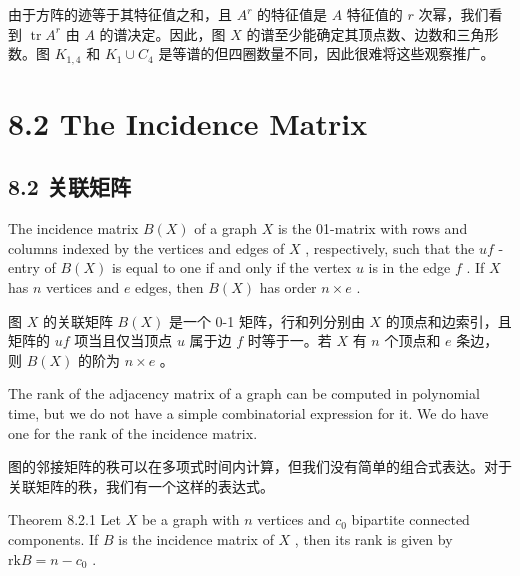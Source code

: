 \documentclass[10pt]{article}
\begin{document}
\begin{tcolorbox}\relax
由于方阵的迹等于其特征值之和，且 \({A}^{r}\) 的特征值是 \(A\) 特征值的 \(r\) 次幂，我们看到 \(\operatorname{tr}{A}^{r}\) 由 \(A\) 的谱决定。因此，图 \(X\) 的谱至少能确定其顶点数、边数和三角形数。图 \({K}_{1,4}\) 和 \({K}_{1} \cup  {C}_{4}\) 是等谱的但四圈数量不同，因此很难将这些观察推广。
\end{tcolorbox}

\section*{8.2 The Incidence Matrix}

\begin{tcolorbox}\relax
\section*{8.2 关联矩阵}
\end{tcolorbox}

The incidence matrix \(B\left( X\right)\) of a graph \(X\) is the 01-matrix with rows and columns indexed by the vertices and edges of \(X\) , respectively, such that the \({uf}\) -entry of \(B\left( X\right)\) is equal to one if and only if the vertex \(u\) is in the edge \(f\) . If \(X\) has \(n\) vertices and \(e\) edges, then \(B\left( X\right)\) has order \(n \times  e\) .

\begin{tcolorbox}\relax
图 \(X\) 的关联矩阵 \(B\left( X\right)\) 是一个 0-1 矩阵，行和列分别由 \(X\) 的顶点和边索引，且矩阵的 \({uf}\) 项当且仅当顶点 \(u\) 属于边 \(f\) 时等于一。若 \(X\) 有 \(n\) 个顶点和 \(e\) 条边，则 \(B\left( X\right)\) 的阶为 \(n \times  e\) 。
\end{tcolorbox}

The rank of the adjacency matrix of a graph can be computed in polynomial time, but we do not have a simple combinatorial expression for it. We do have one for the rank of the incidence matrix.

\begin{tcolorbox}\relax
图的邻接矩阵的秩可以在多项式时间内计算，但我们没有简单的组合式表达。对于关联矩阵的秩，我们有一个这样的表达式。
\end{tcolorbox}

Theorem 8.2.1 Let \(X\) be a graph with \(n\) vertices and \({c}_{0}\) bipartite connected components. If \(B\) is the incidence matrix of \(X\) , then its rank is given by \(\mathrm{{rk}}B = n - {c}_{0}\) .
\end{document}
